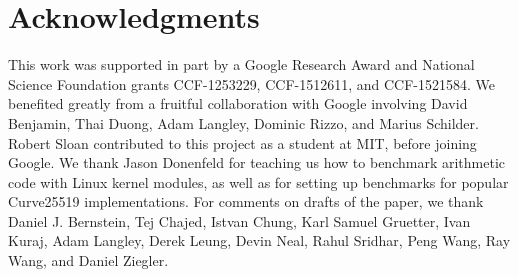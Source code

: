 \documentclass[letterpaper,twocolumn,10pt]{article}
\begin{document}
\section*{Acknowledgments}

This work was supported in part by a Google Research Award and National Science Foundation grants CCF-1253229, CCF-1512611, and CCF-1521584.
We benefited greatly from a fruitful collaboration with Google involving David Benjamin, Thai Duong, Adam Langley, Dominic Rizzo, and Marius Schilder.
Robert Sloan contributed to this project as a student at MIT, before joining Google.
We thank Jason Donenfeld for teaching us how to benchmark arithmetic code with Linux kernel modules, as well as for setting up benchmarks for popular Curve25519 implementations.
For comments on drafts of the paper, we thank Daniel J. Bernstein, Tej Chajed, Istvan Chung, Karl Samuel Gruetter, Ivan Kuraj, Adam Langley, Derek Leung, Devin Neal, Rahul Sridhar, Peng Wang, Ray Wang, and Daniel Ziegler.

\balance

\end{document}

